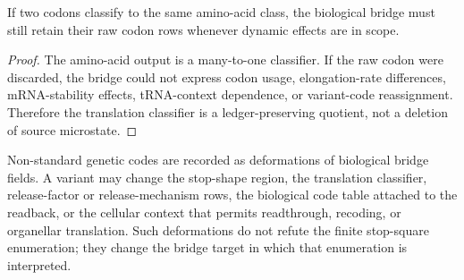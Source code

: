 \begin{theorem}
\label{thm:philosophy-translation-not-microstate-collapse}
If two codons classify to the same amino-acid class, the biological
bridge must still retain their raw codon rows whenever dynamic effects
are in scope.
\end{theorem}
\begin{proof}
The amino-acid output is a many-to-one classifier. If the raw codon were
discarded, the bridge could not express codon usage, elongation-rate
differences, mRNA-stability effects, tRNA-context dependence, or
variant-code reassignment. Therefore the translation classifier is a
ledger-preserving quotient, not a deletion of source microstate.
\end{proof}

\begin{definition}
\label{def:philosophy-variant-code-deformation-fields}
Non-standard genetic codes are recorded as deformations of biological
bridge fields. A variant may change the stop-shape region, the
translation classifier, release-factor or release-mechanism rows, the
biological code table attached to the readback, or the cellular context
that permits readthrough, recoding, or organellar translation. Such
deformations do not refute the finite stop-square enumeration; they
change the bridge target in which that enumeration is interpreted.
\end{definition}

